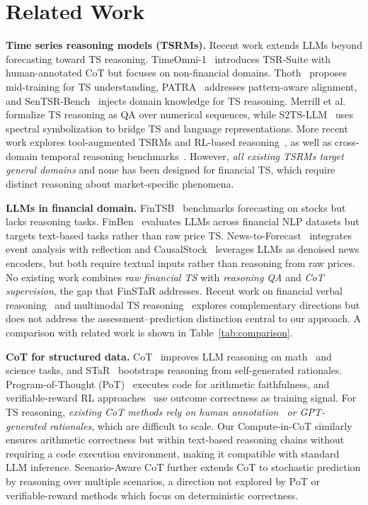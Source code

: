 \section{Related Work}
\textbf{Time series reasoning models (TSRMs).}
Recent work extends LLMs beyond forecasting toward TS reasoning.
TimeOmni-1~\cite{timeomni1} introduces TSR-Suite with human-annotated CoT but focuses on non-financial domains.
Thoth~\cite{thoth2026} proposes mid-training for TS understanding,
PATRA~\cite{patra2026} addresses pattern-aware alignment, and SenTSR-Bench~\cite{sentsr2026} injects domain knowledge for TS reasoning.
Merrill et al.~\cite{merrill2024towards} formalize TS reasoning as QA over numerical sequences, while S2TS-LLM~\cite{s2tsllm2025} uses spectral symbolization to bridge TS and language representations.
More recent work explores tool-augmented TSRMs and RL-based reasoning~\cite{timeart2025, timer1_2025}, as well as cross-domain temporal reasoning benchmarks~\cite{mtbench2025}.
However, \textit{all existing TSRMs target general domains} and none has been designed for financial TS, which require distinct reasoning about market-specific phenomena. 

\textbf{LLMs in financial domain.}
FinTSB~\cite{liu2025fintsb} benchmarks forecasting on stocks but lacks reasoning tasks.
FinBen~\cite{finben2024} evaluates LLMs across financial NLP datasets but targets text-based tasks rather than raw price TS.
News-to-Forecast~\cite{newforecast2024} integrates event analysis with reflection and CausalStock~\cite{causalstock2024} leverages LLMs as denoised news encoders, but both require textual inputs rather than reasoning from raw prices.
No existing work combines \textit{raw financial TS} with \textit{reasoning QA} and \textit{CoT supervision}, the gap that FinSTaR addresses.
Recent work on
financial verbal reasoning~\cite{fin_rl_reason2025} and multimodal TS reasoning~\cite{vta2025} explores complementary directions but does not address the assessment--prediction distinction central to our approach.
A comparison with related work is shown in Table~\ref{tab:comparison}.

\textbf{CoT for structured data.}
CoT~\cite{wei2022chain} improves LLM reasoning on math~\cite{cobbe2021gsm8k} and science tasks, and STaR~\cite{star2022} bootstraps reasoning from self-generated rationales.
Program-of-Thought (PoT)~\cite{pot2023} executes code for arithmetic faithfulness, and verifiable-reward RL approaches~\cite{counts2025} use outcome correctness as training signal.
For TS reasoning, \textit{existing CoT methods rely on human annotation~\cite{timeomni1} or GPT-generated rationales}, which are difficult to scale.
Our Compute-in-CoT similarly ensures arithmetic correctness but within text-based reasoning chains without requiring a code execution environment, making it compatible with standard LLM inference.
Scenario-Aware CoT further extends CoT to stochastic prediction by reasoning over multiple scenarios, a direction not explored by PoT or verifiable-reward methods which focus on deterministic correctness.
